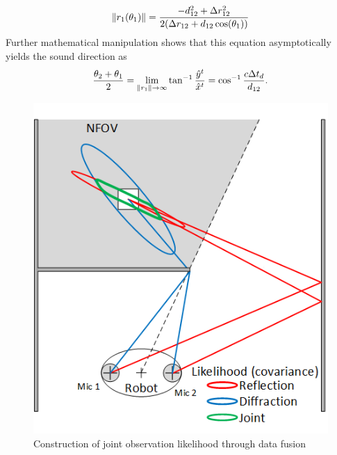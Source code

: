 \documentclass[letterpaper, 10 pt, conference]{ieeeconf}  %
\begin{document}
\begin{equation}\label{eq:estimation_reflection}
\lVert{r_1(\theta_1)}\rVert=\frac{-d_{12}^2+\Delta r_{12}^2}{2(\Delta r_{12}+d_{12}\cos(\theta_1))}
\end{equation}
Further mathematical manipulation shows that this equation asymptotically yields the sound direction as 
\begin{equation}\label{eq:dirction_reflection}
\frac{\theta_2+\theta_1}{2} = \lim_{\lVert{r_1}\rVert \rightarrow \infty} \tan^{-1} \frac{\hat y^t}{\hat x^t}= \cos^{-1} \frac{c \Delta t_d}{d_{12}}.   
\end{equation}

\begin{figure}[thpb]
  \centering
  \includegraphics[width=0.7\columnwidth]{Figures/Joint_likelihood.png} %
  \caption{Construction of joint observation likelihood through data fusion}
  \label{fig:data_fusion}
\end{figure}
\end{document}
